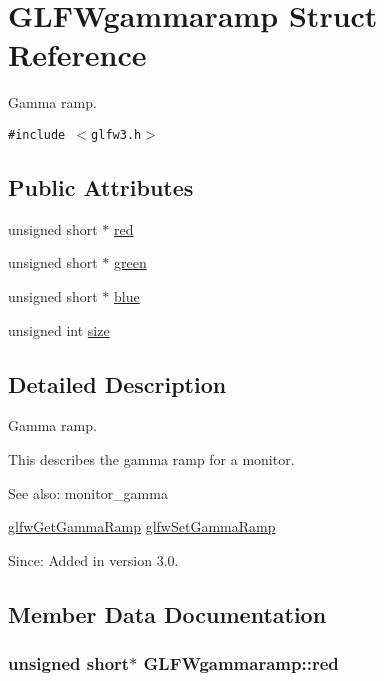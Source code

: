 \hypertarget{struct_g_l_f_wgammaramp}{
\section{GLFWgammaramp Struct Reference}
\label{struct_g_l_f_wgammaramp}
}
Gamma ramp.  


{\tt \#include $<$glfw3.h$>$}

\subsection*{Public Attributes}
\begin{CompactItemize}
\item 
unsigned short $\ast$ \hyperlink{struct_g_l_f_wgammaramp_2cce5d968734b685623eef913e635138}{red}
\item 
unsigned short $\ast$ \hyperlink{struct_g_l_f_wgammaramp_ffccc6f5df47820b6562d709da3a5a3a}{green}
\item 
unsigned short $\ast$ \hyperlink{struct_g_l_f_wgammaramp_cf0c836d0efe29c392fe8d1a1042744b}{blue}
\item 
unsigned int \hyperlink{struct_g_l_f_wgammaramp_d620e1cffbff9a32c51bca46301b59a5}{size}
\end{CompactItemize}


\subsection{Detailed Description}
Gamma ramp. 

This describes the gamma ramp for a monitor.

\begin{Desc}
\item[See also:]monitor\_\-gamma 

\hyperlink{group__monitor_geeac9198f3c91b83440eed679441f76b}{glfwGetGammaRamp} \hyperlink{group__monitor_gc9f36a1cfa10eab191d3029ea8bc9558}{glfwSetGammaRamp}\end{Desc}
\begin{Desc}
\item[Since:]Added in version 3.0. \end{Desc}


\subsection{Member Data Documentation}
\hypertarget{struct_g_l_f_wgammaramp_2cce5d968734b685623eef913e635138}{
\subsubsection[red]{\setlength{\rightskip}{0pt plus 5cm}unsigned short$\ast$ {\bf GLFWgammaramp::red}}}
\label{struct_g_l_f_wgammaramp_2cce5d968734b685623eef913e635138}


